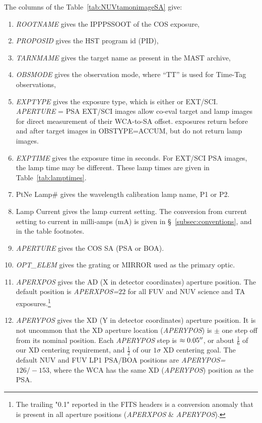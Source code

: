 The columns of the Table~\ref{tab:NUVtamonimageSA} give:
\footnotesize
\begin{enumerate}
\item \textit{ROOTNAME} gives the IPPPSSOOT of the COS exposure,
\item \textit{PROPOSID} gives the HST program id (PID),
\item \textit{TARNMAME} gives the target name as present in the MAST archive,
\item \textit{OBSMODE} gives the observation mode, where ``TT'' is used for Time-Tag observations,
\item \textit{EXPTYPE} gives the exposure type, which is either  or EXT/SCI. \textit{APERTURE} = PSA EXT/SCI images allow co-eval target and lamp images for
direct measurement of their WCA-to-SA offset.  exposures return before and after target images in \textsc{OBSTYPE}=ACCUM, but do not return lamp images.
\item \textit{EXPTIME} gives the exposure time in seconds. For EXT/SCI PSA images, the lamp time may be different. These lamp times are given in Table~\ref{tab:lamptimes}.
\item PtNe Lamp\# gives the wavelength calibration lamp name, P1 or P2.
\item Lamp Current gives the lamp current setting. The conversion from current setting to current in milli-amps (mA) is given in \S~\ref{subsec:conventions}, and in the table footnotes.
\item \textit{APERTURE} gives the COS SA (PSA or BOA).
\item \textit{OPT\_ELEM} gives the grating or MIRROR used as the primary optic.
\item \textit{APERXPOS} gives the AD (X in detector coordinates) aperture position. The default position is \textit{APERXPOS=$22$} for all FUV and NUV science and TA exposures.\footnote{The trailing "0.1" reported in the FITS headers is a conversion anomaly that is present in all aperture positions (\textit{APERXPOS} \& \textit{APERYPOS}).}
\item \textit{APERYPOS} gives the XD (Y in detector coordinates) aperture position. It is not uncommon that the XD aperture location (\textit{APERYPOS}) is $\pm$ one step off from its nominal position. Each \textit{APERYPOS} step is $\approx0.05\hbox{$^{\prime\prime}$}$, or about $\frac{1}{6}$ of
our XD centering requirement, and $\frac{1}{2}$ of our $1\sigma$ XD centering goal. The default NUV and FUV LP1 PSA/BOA positions are \textit{APERYPOS=$126/-153$}, where the WCA has the same XD (\textit{APERYPOS}) position as the PSA.

\end{enumerate}
